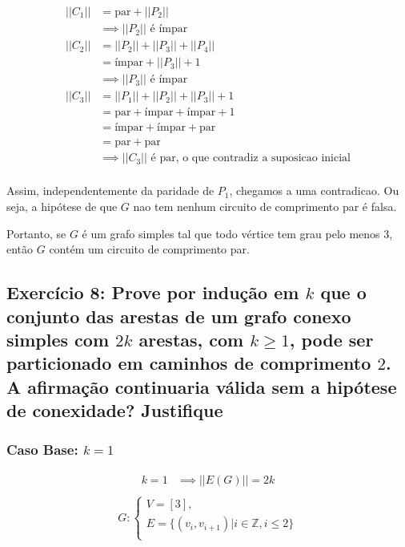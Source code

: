 \documentclass{article}
\begin{document}
\begin{align}
	||C_1|| &= \text{par} + ||P_2|| \\
	&\implies ||P_2|| \text{  é ímpar} \\
	||C_2|| &= ||P_2|| + ||P_3|| + ||P_4|| \\
	&= \text{ímpar} + ||P_3||  + 1 \\
	&\implies ||P_3|| \text{   é ímpar} \\
	||C_3|| &= ||P_1|| + ||P_2|| + ||P_3||  +1 \\  
	&= \text{par} + \text{ímpar} + \text{ímpar}  +1 \\  
	&= \text{ímpar} + \text{ímpar} + \text{par}  \\  
	&= \text{par} + \text{par}  \\  
	&\implies 	||C_3|| \text{   é par, o que contradiz a suposicao inicial} \\  
\end{align}

Assim, independentemente da paridade de $P_1$, chegamos a uma contradicao. Ou seja, a hipótese de que $G$ nao tem nenhum circuito de comprimento par é falsa.

Portanto, se $G$ é um grafo simples tal que todo vértice tem grau pelo menos $3$, então $G$ contém um circuito de comprimento par.


\clearpage

 \subsection{Exercício 8: Prove por indução em $k$ que o conjunto das arestas de um grafo conexo simples com $2k$ arestas, com $k \geq 1$, pode ser particionado em caminhos de comprimento $2$. A afirmação continuaria válida sem a hipótese de conexidade? Justifique}


 \subsubsection{Caso Base: $k = 1$}
 
 \begin{align}
 	k = 1 &\implies ||E(G)|| = 2k \\
 \end{align}
\begin{align}
	G : 
	\begin{cases} 
		V = [3], \\
	    E = \{ (v_i, v_{i+1}) | i \in \mathbb{Z}, i \leq 2\} \\
	\end{cases}
\end{align}
\end{document}
